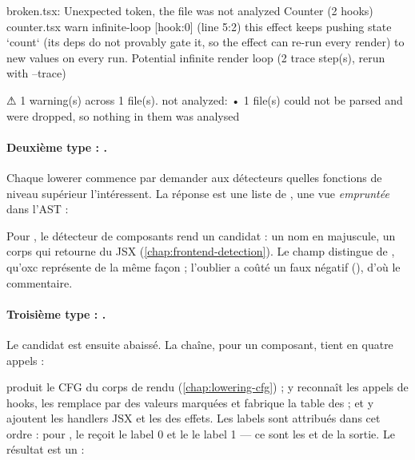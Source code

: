 \begin{sortie}
[skipped] broken.tsx: Unexpected token, the file was not analyzed
  Counter  (2 hooks)  counter.tsx
    warn   infinite-loop  [hook:0]  (line 5:2)  this effect keeps pushing state `count` (its deps do not provably gate it, so the effect can re-run every render) to new values on every run. Potential infinite render loop
       (2 trace step(s), rerun with --trace)

⚠  1 warning(s) across 1 file(s).
   not analyzed:
     • 1 file(s) could not be parsed and were dropped, so nothing in them was analysed
\end{sortie}

\paragraph{Deuxième type : .} Chaque lowerer commence par demander aux détecteurs quelles fonctions de niveau supérieur l'intéressent. La réponse est une liste de , une vue \emph{empruntée} dans l'AST :


Pour , le détecteur de composants rend un candidat  : un nom en majuscule, un corps qui retourne du JSX (\cref{chap:frontend-detection}). Le champ  distingue  de , qu'oxc représente de la même façon ; l'oublier a coûté un faux négatif (), d'où le commentaire.

\paragraph{Troisième type : .} Le candidat est ensuite abaissé. La chaîne, pour un composant, tient en quatre appels :


 produit le CFG du corps de rendu (\cref{chap:lowering-cfg}) ;  y reconnaît les appels de hooks, les remplace par des valeurs marquées et fabrique la table des  ;  et  y ajoutent les handlers JSX et les  des effets. Les labels sont attribués dans cet ordre : pour , le  reçoit le label 0 et le  le label 1 --- ce sont les \code{[hook:0]} et \code{[hook:1]} de la sortie. Le résultat est un  :


